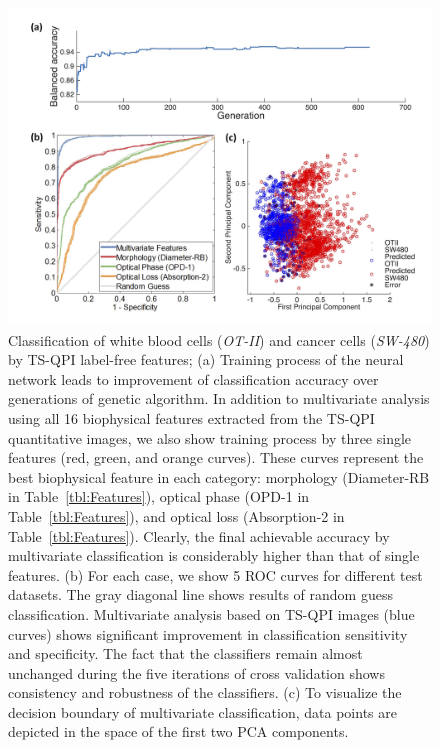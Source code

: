 \documentclass[aps,pra,reprint,longbibliography,superscriptaddress]{revtex4-1}
\begin{document}
\begin{figure}
\includegraphics[scale=0.08]{FigureOTSWROC.jpg}
\caption{\label{fig:OTSWROC} Classification of white blood cells (\textit{OT-II}) and cancer cells (\textit{SW-480}) by TS-QPI label-free features; (a) Training process of the neural network leads to improvement of classification accuracy over generations of genetic algorithm. In addition to multivariate analysis using all 16 biophysical features extracted from the TS-QPI quantitative images, we also show training process by three single features (red, green, and orange curves). These curves represent the best biophysical feature in each category: morphology (Diameter-RB in Table~\ref{tbl:Features}), optical phase (OPD-1 in Table~\ref{tbl:Features}), and optical loss (Absorption-2 in Table~\ref{tbl:Features}). Clearly, the final achievable accuracy by multivariate classification is considerably higher than that of single features. (b) For each case, we show 5 ROC curves for different test datasets. The gray diagonal line shows results of random guess classification. Multivariate analysis based on TS-QPI images (blue curves) shows significant improvement in classification sensitivity and specificity. The fact that the classifiers remain almost unchanged during the five iterations of cross validation shows consistency and robustness of the classifiers. (c) To visualize the decision boundary of multivariate classification, data points are depicted in the space of the first two PCA components.}
\end{figure}
\end{document}
